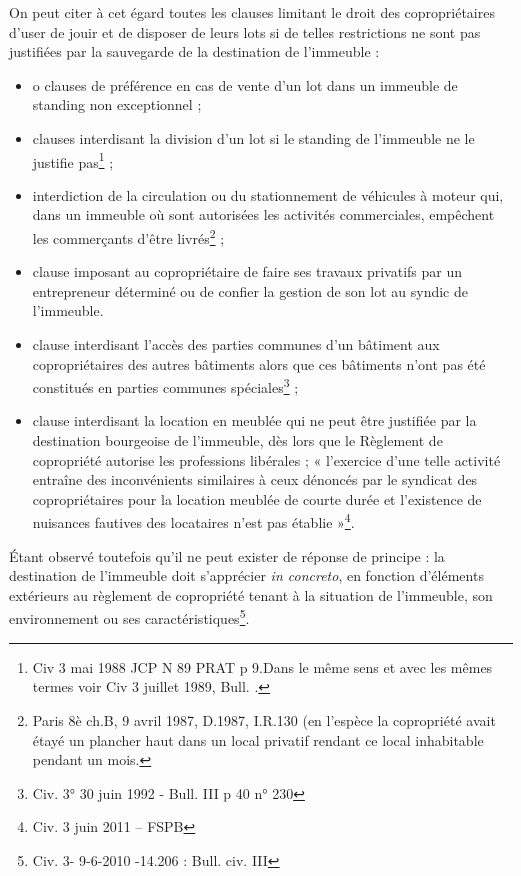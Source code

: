 			On peut citer à cet égard toutes les clauses limitant le droit des copropriétaires d'user de jouir et de disposer de leurs lots si de telles restrictions ne sont pas justifiées par la sauvegarde de la destination de l'immeuble :
			\begin{itemize}
				\item o clauses de préférence en cas de vente d'un lot dans un immeuble de standing non exceptionnel ;
				
				\item clauses interdisant la division d’un lot si le standing de l’immeuble ne le justifie pas\footnote{Civ 3 mai 1988 JCP N 89 PRAT p 9.Dans le même sens et avec les mêmes termes voir Civ 3 juillet 1989, Bull. .} ;
				
				\item interdiction de la circulation ou du stationnement de véhicules à moteur qui, dans un immeuble où sont autorisées les activités commerciales, empêchent les commerçants d'être livrés\footnote{Paris 8è ch.B, 9 avril 1987, D.1987, I.R.130 (en l’espèce la copropriété avait étayé un plancher haut dans un local privatif rendant ce local inhabitable pendant un mois.} ;
				
				\item clause imposant au copropriétaire de faire ses travaux privatifs par un entrepreneur déterminé ou de confier la gestion de son lot au syndic de l'immeuble.
				
				\item clause interdisant l'accès des parties communes d'un bâtiment aux copropriétaires des autres bâtiments alors que ces bâtiments n'ont pas été constitués en parties communes spéciales\footnote{Civ. 3° 30 juin 1992 - Bull. III p 40 n° 230} ;
				
				\item clause interdisant la location en meublée qui ne peut être justifiée par la destination bourgeoise de l’immeuble, dès lors que le Règlement de copropriété autorise les professions libérales ; « l'exercice d'une telle activité entraîne des inconvénients similaires à ceux dénoncés par le syndicat des
				copropriétaires pour la location meublée de courte durée et l'existence de nuisances fautives des locataires n'est pas établie »\footnote{Civ. 3 juin 2011 –  FSPB}.
			\end{itemize}
			
			Étant observé toutefois qu’il ne peut exister de réponse de principe : la destination de l'immeuble doit s'apprécier \emph{in concreto}, en fonction d'éléments extérieurs au règlement de copropriété tenant à la situation de l'immeuble, son environnement ou ses caractéristiques\footnote{Civ. 3\degres - 9-6-2010 -14.206 : Bull. civ. III }.
			
